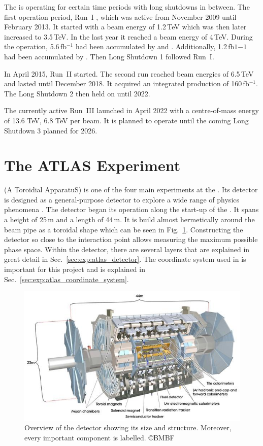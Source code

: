 \documentclass[bachelor,ngerman,english]{GAUBM}
\begin{document}
The \lhc is operating for certain time periods with long shutdowns in between. The first operation period, Run~I \cite{lhc_run1}, which was active from November 2009 until February 2013. It started with a beam energy of 1.2\,TeV which was then later increased to 3.5\,TeV. In the last year it reached a beam energy of 4\,TeV. During the operation, 5.6\,fb$^{-1}$ had been accumulated by \atlas and \cms. Additionally, 1.2\,fb$1{-1}$ had been accumulated by \lhcb. Then Long Shutdown 1 followed Run~I. 

In April 2015, Run~II \cite{lhc_run2} started. The second run reached beam energies of 6.5\,TeV and lasted until December 2018. It acquired an integrated production of 160\,fb$^{-1}$. The Long Shutdown 2 then held on until 2022. 

The currently active Run~III \cite{lhc_run3} launched in April 2022 with a centre-of-mass energy of 13.6 TeV, 6.8 TeV per beam. It is planned to operate until the coming Long Shutdown 3 planned for 2026. 


\section{The ATLAS Experiment}
\label{sec:exp:atlas}
\atlas (A Toroidial \lhc ApparatuS) \cite{atlas} is one of the four main experiments at the \lhc. Its detector is designed as a general-purpose detector to explore a wide range of physics phenomena \cite{atlas:tech_design_report_01,atlas:tech_design_report_02}. The detector began its operation along the start-up of the \lhc. It spans a height of 25\,m and a length of 44\,m. It is build almost hermetically around the \lhc beam pipe as a toroidal shape which can be seen in Fig.~\ref{fig:atlas_overview}. Constructing the detector so close to the interaction point allows measuring the maximum possible phase space. Within the detector, there are several layers that are explained in great detail in Sec.~\ref{sec:exp:atlas_detector}. The coordinate system used in \atlas is important for this project and is explained in Sec.~\ref{sec:exp:atlas_coordinate_system}.


\begin{figure}[t]
    \centering
    \includegraphics[width=.61\textwidth]{figures/lhc/atlas_overview.jpg}
    \caption{Overview of the \atlas detector showing its size and structure. Moreover, every important component is labelled. \copyright{BMBF}}
    \label{fig:atlas_overview}
\end{figure}
\end{document}
